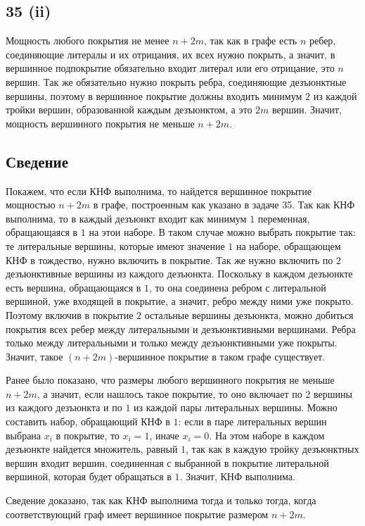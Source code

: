 \documentclass[a4paper,12pt]{article} %
\begin{document}
\subsection{35 (ii)}
\hspace{5mm}
Мощность любого покрытия не менее $n+2m$, так как в графе есть $n$ ребер, соединяющие литералы и их отрицания, их всех нужно покрыть, а значит, в вершинное подпокрытие обязательно входит литерал или его отрицание, это $n$ вершин. Так же обязательно нужно покрыть ребра, соединяющие дезъюнктные вершины, поэтому в вершинное покрытие должны входить минимум $2$ из каждой тройки вершин, образованной каждым дезъюнктом, а это $2m$ вершин. Значит, мощность вершинного покрытия не меньше $n+2m$.

\subsection{Сведение}
\hspace{5mm}
Покажем, что если КНФ выполнима, то найдется вершинное покрытие мощностью $n+2m$ в графе, построенным как указано в задаче 35. Так как КНФ выполнима, то в каждый дезъюнкт входит как минимум $1$ переменная, обращающаяся в $1$ на этои наборе. В таком случае можно выбрать покрытие так: те литеральные вершины, которые имеют значение $1$ на наборе, обращающем КНФ в тождество, нужно включить в покрытие. Так же нужно включить по $2$ дезъюнктивные вершины из каждого дезъюнкта. Поскольку в каждом дезъюнкте есть вершина, обращающаяся в $1$, то она соединена ребром с литеральной вершиной, уже входящей в покрытие, а значит, ребро между ними уже покрыто. Поэтому включив в покрытие $2$ остальные вершины дезъюнкта, можно добиться покрытия всех ребер между литеральными и дезъюнктивными вершинами. Ребра только между литеральными и только между дезъюнктивными уже покрыты. Значит, такое $(n+2m)$-вершинное покрытие в таком графе существует.

Ранее было показано, что размеры любого вершинного покрытия не меньше $n+2m$, а значит, если нашлось такое покрытие, то оно включает по $2$ вершины из каждого дезъюнкта и по $1$ из каждой пары литеральных вершины. Можно составить набор, обращающий КНФ в $1$: если в паре литеральных вершин выбрана $x_i$ в покрытие, то $x_i=1$, иначе $x_i=0$. На этом наборе в каждом дезъюнкте найдется множитель, равный $1$, так как в каждую тройку дезъюнктных вершин входит вершин, соединенная с выбранной в покрытие литеральной вершиной, которая будет обращаться в $1$. Значит, КНФ выполнима.

Сведение доказано, так как КНФ выполнима тогда и только тогда, когда соответствующий граф имеет вершинное покрытие размером $n+2m$.
\end{document}
